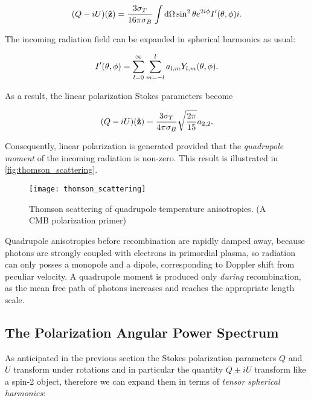 \begin{equation}
        (Q -iU)\qty(\vectorunit{z}) = \frac{3\sigma_T}{16\pi \sigma_B}
        \int \dd{\Omega} \sin^2\theta e^{2i\phi}I'\qty(\theta,\phi)i.
\end{equation}

The incoming radiation field can be expanded in spherical harmonics as
usual:

\begin{equation}
        I'\qty(\theta,\phi) = \sum^\infty_{l = 0}\sum^l_{m = -l}
        a_{l,m} Y_{l,m}\qty(\theta,\phi).
\end{equation}

As a result, the linear polarization Stokes parameters become

\begin{equation}
        (Q - iU)\qty(\vectorunit{z}) = \frac{3\sigma_T}{4\pi\sigma_B}
        \sqrt{\frac{2\pi}{15}} a_{2,2}.
\end{equation}

Consequently, linear polarization is generated provided that the \emph{quadrupole
moment} of the incoming radiation is non-zero. This result is illustrated
in \autoref{fig:thomson_scattering}.

\begin{figure}
        \centering
        \texttt{[image: thomson\_scattering]}
        \caption{Thomson scattering of quadrupole temperature anisotropies.
        (A CMB polarization primer)}
        \label{fig:thomson_scattering}
\end{figure}

Quadrupole anisotropies before recombination are rapidly damped away,
because photons are strongly coupled with electrons in primordial plasma, so
radiation can only posses a monopole and a dipole, corresponding to Doppler
shift from peculiar velocity. A quadrupole moment is produced only
\emph{during} recombination, as the mean free path of photons increases and
reaches the appropriate length scale.

\subsection{The Polarization Angular Power Spectrum}

As anticipated in the previous section the Stokes polarization parameters
$Q$ and $U$ transform under rotations and in particular the quantity $Q \pm
iU$ transform like a spin-2 object, therefore we can expand them in terms
of \emph{tensor spherical harmonics}:


